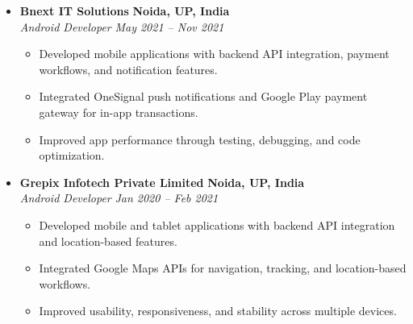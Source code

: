\documentclass[10pt, a4paper]{article}
\begin{document}
\begin{itemize}[leftmargin=0pt, itemsep=0.8ex, topsep=0.3ex]
    \item
    \textbf{Bnext IT Solutions} \hfill \textbf{Noida, UP, India} \\
    \textit{Android Developer} \hfill \textit{May 2021 -- Nov 2021}
    \begin{itemize}[leftmargin=1.5em, itemsep=0.25ex, topsep=0.25ex]
        \item Developed mobile applications with backend API integration, payment workflows, and notification features.
        \item Integrated OneSignal push notifications and Google Play payment gateway for in-app transactions.
        \item Improved app performance through testing, debugging, and code optimization.
    \end{itemize}

    \item
    \textbf{Grepix Infotech Private Limited} \hfill \textbf{Noida, UP, India} \\
    \textit{Android Developer} \hfill \textit{Jan 2020 -- Feb 2021}
    \begin{itemize}[leftmargin=1.5em, itemsep=0.25ex, topsep=0.25ex]
        \item Developed mobile and tablet applications with backend API integration and location-based features.
        \item Integrated Google Maps APIs for navigation, tracking, and location-based workflows.
        \item Improved usability, responsiveness, and stability across multiple devices.
    \end{itemize}

\end{itemize}

\end{document}
